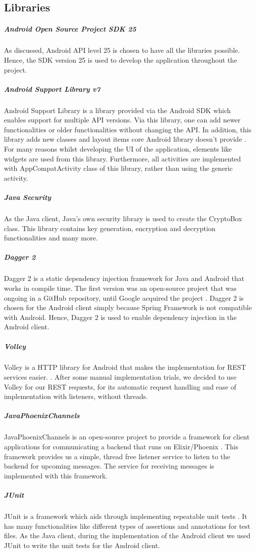 \documentclass[11pt,a4paper]{report}
\begin{document}
\subsection{Libraries}
\subparagraph{Android Open Source Project SDK 25}
As discussed, Android API level 25 is chosen to have all the libraries possible. Hence, the SDK version 25 is used to develop the application throughout the project.
\subparagraph{Android Support Library v7}
Android Support Library is a library provided via the Android SDK which enables support for multiple API versions. Via this library, one can add newer functionalities or older functionalities without changing the API. In addition, this library adds new classes and layout items core Android library doesn’t provide \cite{website:android_support_library}. For many reasons whilst developing the UI of the application, elements like widgets are used from this library. Furthermore, all activities are implemented with AppCompatActivity class of this library, rather than using the generic activity.
\subparagraph{Java Security}
As the Java client, Java’s own security library is used to create the CryptoBox class. This library contains key generation, encryption and decryption functionalities and many more.
\subparagraph{Dagger 2}
Dagger 2 is a static dependency injection framework for Java and Android that works in compile time. The first version was an open-source project that was ongoing in a GitHub repository, until Google acquired the project \cite{website:dagger_homepage}. Dagger 2 is chosen for the Android client simply because Spring Framework is not compatible with Android. Hence, Dagger 2 is used to enable dependency injection in the Android client.
\subparagraph{Volley}
Volley is a HTTP library for Android that makes the implementation for REST services easier. \cite{website:volley_homepage}. After some manual implementation trials, we decided to use Volley for our REST requests, for its automatic request handling and ease of implementation with listeners, without threads.
\subparagraph{JavaPhoenixChannels}
JavaPhoenixChannels is an open-source project to provide a framework for client applications for communicating a backend that runs on Elixir/Phoenix \cite{website:java_phoenix_channels_homepage}. This framework provides us a simple, thread free listener service to listen to the backend for upcoming messages. The service for receiving messages is implemented with this framework.
\subparagraph{JUnit}
JUnit is a framework which aids through implementing repeatable unit tests \cite{website:junit_homepage}. It has many functionalities like different types of assertions and annotations for test files. As the Java client, during the implementation of the Android client we used JUnit to write the unit tests for the Android client.
\end{document}
